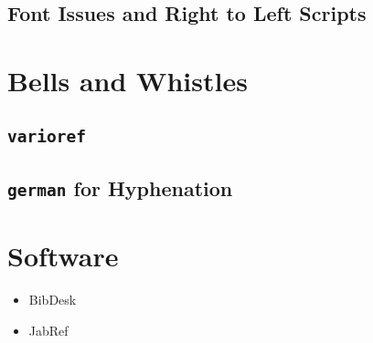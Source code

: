 









\subsection{Font Issues and Right to Left Scripts}


  
\section{Bells and Whistles}

\subsection{\texttt{varioref}}

\subsection{\texttt{german} for Hyphenation}

\section{Software}

\begin{itemize}
\item BibDesk
\item JabRef
\end{itemize}


